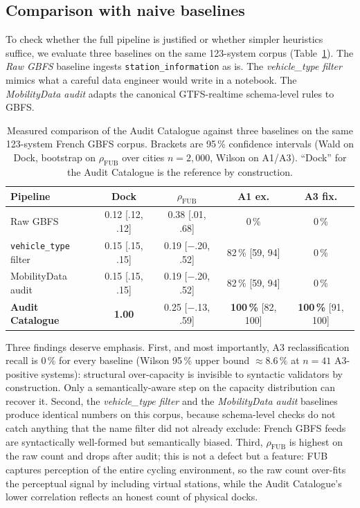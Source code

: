 \documentclass[11pt,a4paper]{article}
\begin{document}
\subsection{Comparison with naive baselines}
To check whether the full pipeline is justified or whether simpler
heuristics suffice, we evaluate three baselines on the
same 123-system corpus
(Table~\ref{tab:baselines}). The \emph{Raw GBFS} baseline ingests
\texttt{station\_information} as is. The \emph{vehicle\_type filter}
mimics what a careful data engineer would write in a notebook. The
\emph{MobilityData audit} adapts the canonical GTFS-realtime
schema-level rules to GBFS.

\begin{table}[ht]
\centering
\caption{Measured comparison of the Audit Catalogue against three
baselines on the same 123-system French GBFS corpus. Brackets are
95\,\% confidence intervals (Wald on Dock, bootstrap on
$\rho_{\text{FUB}}$ over cities $n=2{,}000$, Wilson on A1/A3). ``Dock''
for the Audit Catalogue is the reference by construction.}
\label{tab:baselines}
\small
\begin{tabular}{@{}lcccc@{}}
\toprule
\textbf{Pipeline} & \textbf{Dock} & \textbf{$\rho_{\text{FUB}}$} &
\textbf{A1 ex.} & \textbf{A3 fix.}\\
\midrule
Raw GBFS &
  0.12 \footnotesize[.12, .12] &
  0.38 \footnotesize[.01, .68] &
  0\,\% & 0\,\% \\
\texttt{vehicle\_type} filter &
  0.15 \footnotesize[.15, .15] &
  0.19 \footnotesize[$-$.20, .52] &
  82\,\% \footnotesize[59, 94] & 0\,\% \\
MobilityData audit &
  0.15 \footnotesize[.15, .15] &
  0.19 \footnotesize[$-$.20, .52] &
  82\,\% \footnotesize[59, 94] & 0\,\% \\
\textbf{Audit Catalogue} &
  \textbf{1.00} &
  0.25 \footnotesize[$-$.13, .59] &
  \textbf{100\,\%} \footnotesize[82, 100] &
  \textbf{100\,\%} \footnotesize[91, 100] \\
\bottomrule
\end{tabular}
\end{table}

Three findings deserve emphasis. First, and most importantly, A3
reclassification recall is $0\,\%$ for every baseline (Wilson 95\,\%
upper bound $\approx 8.6\,\%$ at $n = 41$ A3-positive systems):
structural over-capacity is invisible to syntactic validators by
construction. Only a semantically-aware step on the
capacity distribution can recover it. Second, the
\emph{vehicle\_type filter} and the \emph{MobilityData audit} baselines
produce identical numbers on this corpus, because schema-level checks
do not catch anything that the name filter did not already exclude:
French GBFS feeds are syntactically well-formed but semantically
biased. Third, $\rho_{\text{FUB}}$ is highest on the raw count and
drops after audit; this is not a defect but a feature: FUB captures
perception of the entire cycling environment, so the raw count
over-fits the perceptual signal by including virtual stations, while
the Audit Catalogue's lower correlation reflects an honest count of
physical docks.
\end{document}
